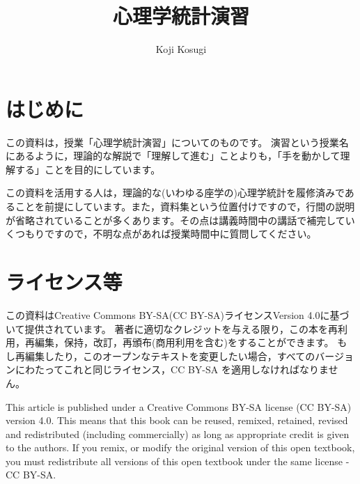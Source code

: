 \documentclass[
  a4paper,
]{ltjsbook}
\title{心理学統計演習}
\author{Koji Kosugi}
\date{}
\renewcommand*\contentsname{Table of contents}
\newcommand\contentsname{Table of contents}
\begin{document}
\maketitle
\ifdefined\Shaded\renewenvironment{Shaded}{\begin{tcolorbox}[boxrule=0pt, breakable, enhanced, sharp corners, interior hidden, frame hidden, borderline west={3pt}{0pt}{shadecolor}]}{\end{tcolorbox}}\fi

\renewcommand*\contentsname{Table of contents}
{
\hypersetup{linkcolor=}
\setcounter{tocdepth}{2}
\tableofcontents
}

\hypertarget{ux306fux3058ux3081ux306b}{%
\chapter{はじめに}\label{ux306fux3058ux3081ux306b}}

この資料は，授業「心理学統計演習」についてのものです。
演習という授業名にあるように，理論的な解説で「理解して進む」ことよりも，「手を動かして理解する」ことを目的にしています。

この資料を活用する人は，理論的な(いわゆる座学の)心理学統計を履修済みであることを前提にしています。また，資料集という位置付けですので，行間の説明が省略されていることが多くあります。その点は講義時間中の講話で補完していくつもりですので，不明な点があれば授業時間中に質問してください。


\hypertarget{ux30e9ux30a4ux30bbux30f3ux30b9ux7b49}{%
\chapter{ライセンス等}\label{ux30e9ux30a4ux30bbux30f3ux30b9ux7b49}}

この資料はCreative Commons BY-SA(CC BY-SA)ライセンスVersion
4.0に基づいて提供されています。
著者に適切なクレジットを与える限り，この本を再利用，再編集，保持，改訂，再頒布(商用利用を含む)をすることができます。
もし再編集したり，このオープンなテキストを変更したい場合，すべてのバージョンにわたってこれと同じライセンス，CC
BY-SA を適用しなければなりません。

This article is published under a Creative Commons BY-SA license (CC
BY-SA) version 4.0. This means that this book can be reused, remixed,
retained, revised and redistributed (including commercially) as long as
appropriate credit is given to the authors. If you remix, or modify the
original version of this open textbook, you must redistribute all
versions of this open textbook under the same license - CC BY-SA.
\end{document}
